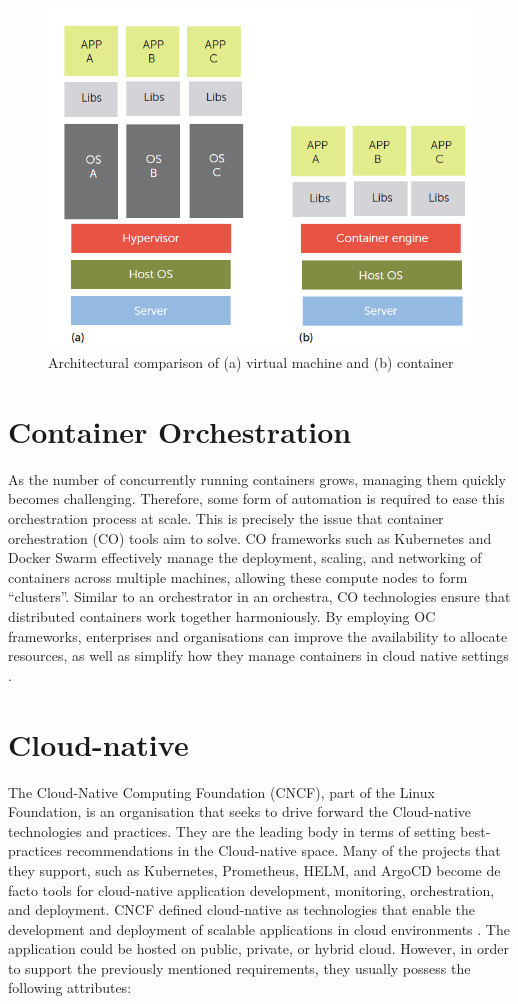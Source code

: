 \begin{figure}
    \centering
    \includegraphics[width=0.7\linewidth]{resources/eea3da004befcc5437960cbc868be634.png}
    \caption{Architectural comparison of (a) virtual machine and (b) container \cite{bernstein_containers_2014}}
    \label{fig:vms-vs-containers}
\end{figure}

\section{Container Orchestration}

As the number of concurrently running containers grows, managing them quickly becomes challenging. Therefore, some form of automation is required to ease this orchestration process at scale. This is precisely the issue that container orchestration (CO) tools aim to solve. CO frameworks such as Kubernetes and Docker Swarm effectively manage the deployment, scaling, and networking of containers across multiple machines, allowing these compute nodes to form “clusters”. Similar to an orchestrator in an orchestra, CO technologies ensure that distributed containers work together harmoniously. By employing OC frameworks, enterprises and organisations can improve the availability to allocate resources, as well as simplify how they manage containers in cloud native settings \cite{truyen_comprehensive_2019}.

\section{Cloud-native}
The Cloud-Native Computing Foundation (CNCF), part of the Linux Foundation, is an organisation that seeks to drive forward the Cloud-native technologies and practices. They are the leading body in terms of setting best-practices recommendations in the Cloud-native space. Many of the projects that they support, such as Kubernetes, Prometheus, HELM, and ArgoCD become de facto tools for cloud-native application development, monitoring, orchestration, and deployment. CNCF defined cloud-native as technologies that enable the development and deployment of scalable applications in cloud environments \cite{cloud_native_computing_foundation_who_nodate}. The application could be hosted on public, private, or hybrid cloud. However, in order to support the previously mentioned requirements, they usually possess the following attributes:

